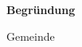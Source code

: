 
\thispagestyle{empty}
\begin{center}
  \vspace*{4cm}
  {\Large\bfseries Begründung\par}
  \vspace{2cm}
  {\large \BPlanTyp\par}
  \vspace{0.5cm}
  {\large \BPlanName\par}
  \vspace{1cm}
  {\normalsize Gemeinde \Gemeinde\par}
  \vspace{4cm}
  {\small \OfficeName\\
   \OfficeAddressLines\par}
\end{center}
\cleardoublepage
